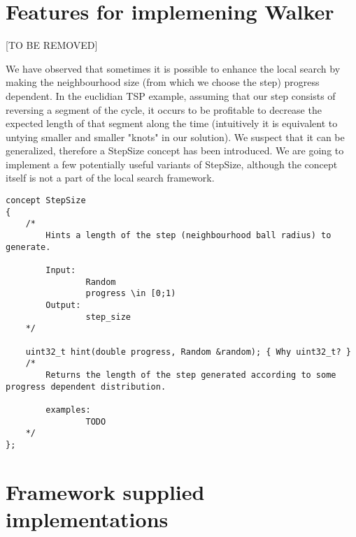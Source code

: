 \section{Features for implemening Walker}
[TO BE REMOVED]

We have observed that sometimes it is possible to enhance the local search
by making the neighbourhood size (from which we choose the step) progress dependent.
In the euclidian TSP example, assuming that our step consists of reversing a segment of the cycle,
it occurs to be profitable to decrease the expected length of that segment along the time
(intuitively it is equivalent to untying smaller and smaller "knots" in our solution).
We suspect that it can be generalized, therefore a StepSize concept has been introduced.
We are going to implement a few potentially useful variants of StepSize,
although the concept itself is not a part of the local search framework.

\begin{lstlisting}
concept StepSize
{
	/*
		Hints a length of the step (neighbourhood ball radius) to generate.

		Input:
				Random
				progress \in [0;1)
		Output:
				step_size
	*/

	uint32_t hint(double progress, Random &random); { Why uint32_t? }
	/*
		Returns the length of the step generated according to some progress dependent distribution.

		examples:
				TODO
	*/
};
\end{lstlisting}

\section{Framework supplied implementations}
